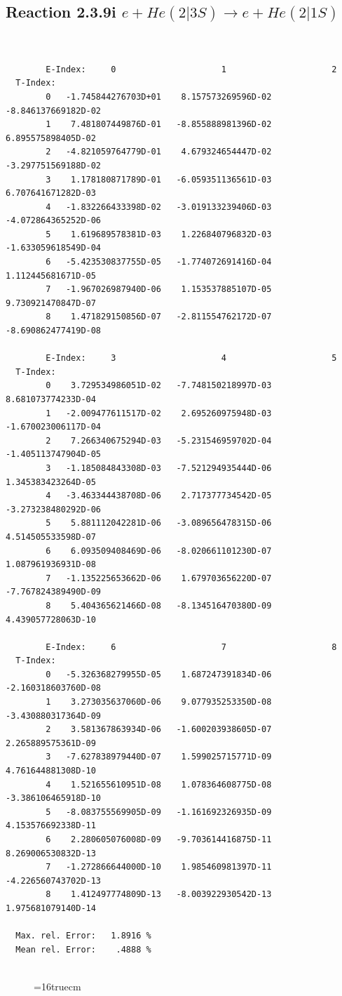 \documentclass[12pt,dvips]{article}
\begin{document}
\subsection{
Reaction 2.3.9i $ e + He(2|3S) \rightarrow e + He(2|1S) $
}


\begin{small}\begin{verbatim}


        E-Index:     0                     1                     2
  T-Index:
        0   -1.745844276703D+01    8.157573269596D-02   -8.846137669182D-02
        1    7.481807449876D-01   -8.855888981396D-02    6.895575898405D-02
        2   -4.821059764779D-01    4.679324654447D-02   -3.297751569188D-02
        3    1.178180871789D-01   -6.059351136561D-03    6.707641671282D-03
        4   -1.832266433398D-02   -3.019133239406D-03   -4.072864365252D-06
        5    1.619689578381D-03    1.226840796832D-03   -1.633059618549D-04
        6   -5.423530837755D-05   -1.774072691416D-04    1.112445681671D-05
        7   -1.967026987940D-06    1.153537885107D-05    9.730921470847D-07
        8    1.471829150856D-07   -2.811554762172D-07   -8.690862477419D-08

        E-Index:     3                     4                     5
  T-Index:
        0    3.729534986051D-02   -7.748150218997D-03    8.681073774233D-04
        1   -2.009477611517D-02    2.695260975948D-03   -1.670023006117D-04
        2    7.266340675294D-03   -5.231546959702D-04   -1.405113747904D-05
        3   -1.185084843308D-03   -7.521294935444D-06    1.345383423264D-05
        4   -3.463344438708D-06    2.717377734542D-05   -3.273238480292D-06
        5    5.881112042281D-06   -3.089656478315D-06    4.514505533598D-07
        6    6.093509408469D-06   -8.020661101230D-07    1.087961936931D-08
        7   -1.135225653662D-06    1.679703656220D-07   -7.767824389490D-09
        8    5.404365621466D-08   -8.134516470380D-09    4.439057728063D-10

        E-Index:     6                     7                     8
  T-Index:
        0   -5.326368279955D-05    1.687247391834D-06   -2.160318603760D-08
        1    3.273035637060D-06    9.077935253350D-08   -3.430880317364D-09
        2    3.581367863934D-06   -1.600203938605D-07    2.265889575361D-09
        3   -7.627838979440D-07    1.599025715771D-09    4.761644881308D-10
        4    1.521655610951D-08    1.078364608775D-08   -3.386106465918D-10
        5   -8.083755569905D-09   -1.161692326935D-09    4.153576692338D-11
        6    2.280605076008D-09   -9.703614416875D-11    8.269006530832D-13
        7   -1.272866644000D-10    1.985460981397D-11   -4.226560743702D-13
        8    1.412497774809D-13   -8.003922930542D-13    1.975681079140D-14

  Max. rel. Error:   1.8916 %
  Mean rel. Error:    .4888 %


\end{verbatim}\end{small}
\begin{figure} \label{2.3.9i}
\epsfxsize=16truecm
\end{figure}
\newpage
\end{document}
